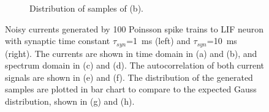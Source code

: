 \begin{figure}[tbp!]
\begin{subfigure}[t]{0.43\textwidth}
			\caption{Distribution of samples of (b).}
		\end{subfigure}
		\caption{Noisy currents generated by 100 Poinsson spike trains to \DIFdelbeginFL {}\DIFdelendFL \DIFaddbeginFL {}\DIFaddendFL LIF neuron with synaptic time constant $\tau_{syn}$=1~ms (left) and $\tau_{syn}$=10~ms (right). The currents are shown in \DIFaddbeginFL {}\DIFaddendFL time domain in (a) and (b), and \DIFaddbeginFL {}\DIFaddendFL spectrum domain in (c) and (d). The autocorrelation of both current signals are shown in (e) and (f). The distribution of the generated samples are plotted in bar chart \DIFaddbeginFL {}\DIFaddendFL to compare to the expected Gauss distribution, shown in (g) and (h).}
		\label{Fig:lif_pois}
	\end{figure}

